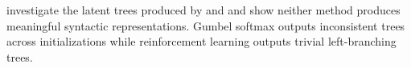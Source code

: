 

\textcite{williams_18} investigate the latent trees produced by \textcite{yogatama_17} and \textcite{choi_18} and show neither method produces meaningful syntactic representations. Gumbel softmax outputs inconsistent trees across initializations while reinforcement learning outputs trivial left-branching trees.



